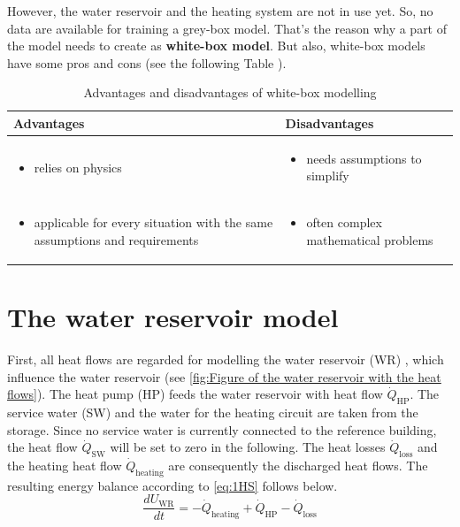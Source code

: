     \newline
    However, the water reservoir and the heating system are not in use yet. So, no data are available for training a grey-box model. That's the reason why a part of the model needs to create as \textbf{white-box model}.
    \newline
    But also, white-box models have some pros and cons (see the following Table \cite{EstradaFlores.2006}).
    \begin{table}[]
    \label{tab:wihte-boxpro}
        \centering
        \begin{tabular}{p{7.3cm} | p{7.3cm}}
        \hline
          Advantages  &  Disadvantages\\
        \hline
        \begin{itemize}
            \item relies on physics
        \end{itemize}
      & \begin{itemize}
            \item needs assumptions to simplify 
        \end{itemize}\\
     \begin{itemize}
            \item applicable for every situation with the same assumptions and requirements 
        \end{itemize} & \begin{itemize}
            \item often complex mathematical problems
        \end{itemize}\\
        \end{tabular}
        \caption {Advantages and disadvantages of white-box modelling}
    \end{table}

    \section{The water reservoir model}
    \label{waterModel}
    First, all heat flows are regarded for modelling the water reservoir (WR)  , which influence the water reservoir (see \autoref{fig:Figure of the water reservoir with the heat flows}). The heat pump (HP)  feeds the water reservoir with heat flow $\dot{Q}_\text{HP}$. The service water (SW)  and the water for the heating circuit are taken from the storage. Since no service water is currently connected to the reference building, the heat flow $\dot{Q}_\text{SW}$ will be set to zero in the following. The heat losses $\dot{Q}_\text{loss}$ and the heating heat flow  $\dot{Q}_\text{heating}$ are consequently the discharged heat flows. The resulting energy balance according to \autoref{eq:1HS} follows below.
    \begin{equation}
        \label{waterReservoir}
        \frac{d U_\text{WR}}{d t}= -\dot{Q}_\text{heating} + \dot{Q}_\text{HP} - \dot{Q}_\text{loss}
    \end{equation}
    
